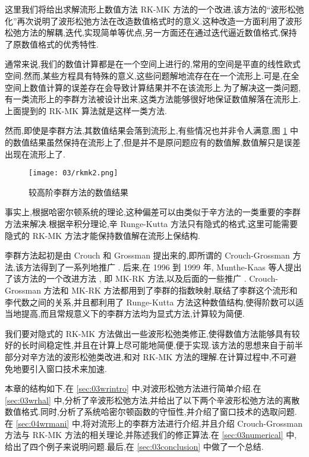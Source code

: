 这里我们将给出求解流形上数值方法 RK-MK \cite{arieh2005liegroup} 方法的一个改进,该方法的``波形松弛化''再次说明了波形松弛方法在改造数值格式时的意义.这种改造一方面利用了波形松弛方法的解耦,迭代,实现简单等优点,另一方面还在通过迭代逼近数值格式,保持了原数值格式的优秀特性.

通常来说,我们的数值计算都是在一个空间上进行的,常用的空间是平直的线性欧式空间.然而,某些方程具有特殊的意义,这些问题解地流存在在一个流形上.可是,在全空间上数值计算的误差存在会导致计算结果并不在该流形上.为了解决这一类问题,有一类流形上的李群方法被设计出来,这类方法能够很好地保证数值解落在流形上.上面提到的 RK-MK 算法就是这样一类方法.

然而,即使是李群方法,其数值结果会落到流形上,有些情况也并非令人满意,图 \ref{fig:rkmk2} 中的数值结果虽然保持在流形上了,但是并不是原问题应有的数值解,数值解只是误差出现在流形上了.
\begin{figure}[h!]
  \centering
  \texttt{[image: 03/rkmk2.png]}
  \caption{较高阶李群方法的数值结果}
  \label{fig:rkmk2}
\end{figure}

事实上,根据哈密尔顿系统的理论,这种偏差可以由类似于辛方法的一类重要的李群方法来解决.根据辛积分理论,辛 Runge-Kutta 方法只有隐式的格式,这里可能需要隐式的 RK-MK 方法才能保持数值解在流形上保结构.

李群方法起初是由 Crouch 和 Grossman \cite{crouch1993numerical} 提出来的,即所谓的 Crouch-Grossman 方法,该方法得到了一系列地推广 \cite{faleinsen2001multi,zaletkin2010numerical,bulychev2001numerical,buono2003numerical,billo1992numerical}. 后来,在 1996 到 1999 年, Munthe-Kaas  等人提出了该方法的一个改进方法 \cite{mk1996lie,mk1997numerical,mk1998runge,mk1999high}, 即 MK-RK 方法,以及后面的一些推广 \cite{ostermann2010exponential,owren2000the,bruls2012lie,munthe2013onpost,garcla2011onalg}. Crouch-Grossman 方法和 MK-RK 方法都用到了李群的指数映射,联结了李群这个流形和李代数之间的关系,并且都利用了 Runge-Kutta 方法这种数值结构,使得阶数可以适当地提高,而且常规意义下的李群方法均为显式方法,计算较为简便.

我们要对隐式的 RK-MK 方法做出一些波形松弛类修正,使得数值方法能够具有较好的长时间稳定性,并且在计算上尽可能地简便,便于实现.该方法的思想来自于前半部分对辛方法的波形松弛类改进,和对 RK-MK 方法的理解.在计算过程中,不可避免地要引入窗口技术来加速.

本章的结构如下.在 \ref{sec:03wrintro} 中,对波形松弛方法进行简单介绍.在 \ref{sec:03wrhal} 中,分析了辛波形松弛方法,并给出了以下两个辛波形松弛方法的离散数值格式.同时,分析了系统哈密尔顿函数的守恒性,并介绍了窗口技术的选取问题.在 \ref{sec:04wrmani} 中,将对流形上的李群方法进行介绍,并且介绍 Crouch-Grossman 方法与 RK-MK 方法的相关理论,并陈述我们的修正算法.在 \ref{sec:03numerical} 中,给出了四个例子来说明问题.最后,在 \ref{sec:03conclusion} 中做了一个总结.


